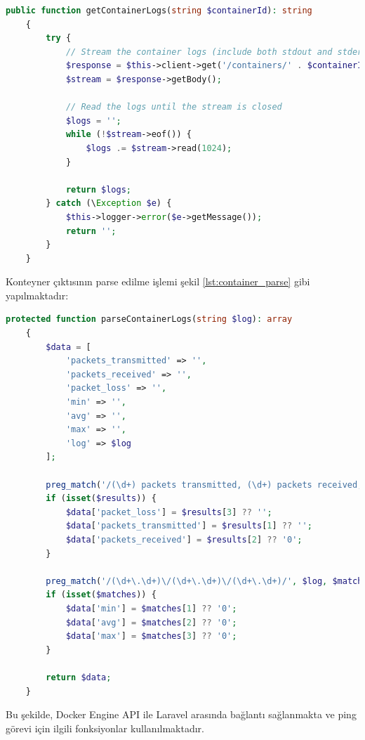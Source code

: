 \begin{lstlisting}[language=PHP, caption={Ping görevi servis metodu}, label={lst:container_cmd_output}]
	public function getContainerLogs(string $containerId): string
    {
        try {
            // Stream the container logs (include both stdout and stderr)
            $response = $this->client->get('/containers/' . $containerId . '/logs?stdout=1&stderr=1&follow=1');
            $stream = $response->getBody();
            
            // Read the logs until the stream is closed
            $logs = '';
            while (!$stream->eof()) {
                $logs .= $stream->read(1024);
            }
            
            return $logs;
        } catch (\Exception $e) {
            $this->logger->error($e->getMessage());
            return '';
        }
    }
	\end{lstlisting}

Konteyner çıktısının parse edilme işlemi şekil \ref{lst:container_parse} gibi yapılmaktadır:

\begin{lstlisting}[language=PHP, caption={Konteyner çıktısı parse işlemi}, label={lst:container_parse}]
	protected function parseContainerLogs(string $log): array
    {
        $data = [
            'packets_transmitted' => '',
            'packets_received' => '',
            'packet_loss' => '',
            'min' => '',
            'avg' => '',
            'max' => '',
            'log' => $log
        ];
        
        preg_match('/(\d+) packets transmitted, (\d+) packets received, (\d+)% packet loss/', $log, $results);
        if (isset($results)) {
            $data['packet_loss'] = $results[3] ?? '';
            $data['packets_transmitted'] = $results[1] ?? '';
            $data['packets_received'] = $results[2] ?? '0';
        }
        
        preg_match('/(\d+\.\d+)\/(\d+\.\d+)\/(\d+\.\d+)/', $log, $matches);
        if (isset($matches)) {
            $data['min'] = $matches[1] ?? '0';
            $data['avg'] = $matches[2] ?? '0';
            $data['max'] = $matches[3] ?? '0';
        }
        
        return $data;
    }
	\end{lstlisting}

Bu şekilde, Docker Engine API ile Laravel arasında bağlantı sağlanmakta ve ping görevi için ilgili fonksiyonlar kullanılmaktadır.

